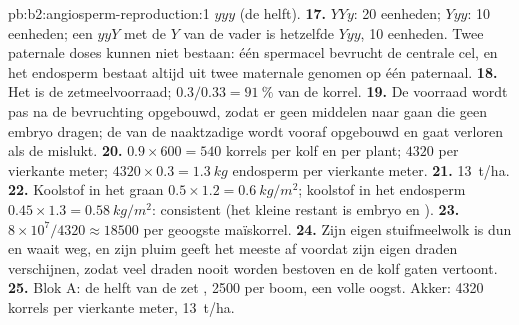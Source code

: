 \begin{solution}{pb:b2:angiosperm-reproduction:1}
$yyy$ (de helft).
\textbf{17.} $YYy$: 20 eenheden; $Yyy$: 10 eenheden; een $yyY$ met de $Y$
van de vader is hetzelfde  $Yyy$, 10 eenheden. Twee paternale
doses kunnen niet bestaan: één spermacel bevrucht de centrale cel, en het
endosperm bestaat altijd uit twee maternale genomen op één paternaal.
\textbf{18.} Het is de zetmeelvoorraad; $0.3/0.33 = \qty{91}{\%}$ van de
korrel.
\textbf{19.} De voorraad wordt pas na de bevruchting opgebouwd, zodat er
geen middelen naar  gaan die geen embryo dragen; de 
van de naaktzadige wordt vooraf opgebouwd en gaat verloren als de
 mislukt.
\textbf{20.} $0.9\times 600 = 540$ korrels per kolf en per plant;
$4320$ per vierkante meter; $4320\times 0.3 = \qty{1.3}{kg}$ endosperm
per vierkante meter.
\textbf{21.} \qty{13}{t/ha}.
\textbf{22.} Koolstof in het graan $0.5\times 1.2 = \qty{0.6}{kg/m^2}$;
koolstof in het endosperm $0.45\times 1.3 = \qty{0.58}{kg/m^2}$:
consistent (het kleine restant is embryo en ).
\textbf{23.} $8\times 10^{7}/4320 \approx \num{18500}$  per
geoogste maïskorrel.
\textbf{24.} Zijn eigen stuifmeelwolk is dun en waait weg, en zijn pluim
geeft het meeste  af voordat zijn eigen draden verschijnen, zodat
veel draden nooit worden bestoven en de kolf gaten vertoont.
\textbf{25.} Blok A: de helft van de  zet , 2500 per boom, een
volle oogst. Akker: 4320 korrels per vierkante meter, \qty{13}{t/ha}.
\end{solution}
